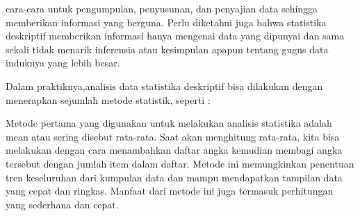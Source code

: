 \documentclass[a4paper,10pt]{article}
\begin{document}
\begin{eulernotebook}
\begin{eulercomment}
\begin{eulercomment}
\begin{eulercomment}
\begin{eulercomment}
\begin{eulercomment}
\begin{eulercomment}
\begin{eulercomment}
\begin{eulercomment}
\begin{eulercomment}
\begin{eulercomment}
\begin{eulercomment}
\begin{eulercomment}
\begin{eulercomment}
cara-cara untuk pengumpulan, penyusunan, dan penyajian data sehingga
memberikan informasi yang berguna. Perlu diketahui juga bahwa
statistika deskriptif memberikan informasi hanya mengenai data yang
dipunyai dan sama sekali tidak menarik inferensia atau kesimpulan
apapun tentang gugus data induknya yang lebih besar.

Dalam praktiknya,analisis data statistika deskriptif bisa dilakukan
dengan menerapkan sejumlah metode statistik, seperti :

\end{eulercomment}
\begin{eulercomment}
Metode pertama yang digunakan untuk melakukan analisis statistika
adalah mean atau sering disebut rata-rata. Saat akan menghitung
rata-rata, kita bisa melakukan dengan cara menambahkan daftar angka
kemudian membagi angka tersebut dengan jumlah item dalam daftar.
Metode ini memungkinkan penentuan tren keseluruhan dari kumpulan data
dan mampu mendapatkan tampilan data yang cepat dan ringkas. Manfaat
dari metode ini juga termasuk perhitungan yang sederhana dan cepat.


\end{eulercomment}
\end{eulercomment}
\end{eulercomment}
\end{eulercomment}
\end{eulercomment}
\end{eulercomment}
\end{eulercomment}
\end{eulercomment}
\end{eulercomment}
\end{eulercomment}
\end{eulercomment}
\end{eulercomment}
\end{eulercomment}
\end{eulernotebook}
\end{document}
